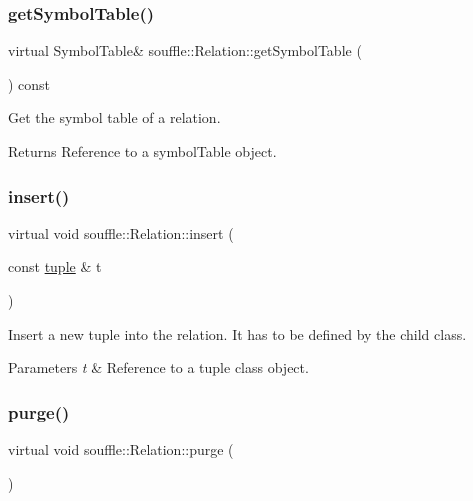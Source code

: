 \subsubsection{\texorpdfstring{get\+Symbol\+Table()}{getSymbolTable()}}
{\footnotesize\ttfamily virtual Symbol\+Table\& souffle\+::\+Relation\+::get\+Symbol\+Table (\begin{DoxyParamCaption}{ }\end{DoxyParamCaption}) const\hspace{0.3cm}{\ttfamily [pure virtual]}}

Get the symbol table of a relation. \begin{DoxyReturn}{Returns}
Reference to a symbol\+Table object. 
\end{DoxyReturn}
\mbox{\label{classsouffle_1_1_relation_a4f118226c04197b2efa9901c91873b09}} 
\subsubsection{\texorpdfstring{insert()}{insert()}}
{\footnotesize\ttfamily virtual void souffle\+::\+Relation\+::insert (\begin{DoxyParamCaption}\item[{const \hyperlink{classsouffle_1_1tuple}{tuple} \&}]{t }\end{DoxyParamCaption})\hspace{0.3cm}{\ttfamily [pure virtual]}}

Insert a new tuple into the relation. It has to be defined by the child class. 
\begin{DoxyParams}{Parameters}
{\em t} & Reference to a tuple class object. \\
\hline
\end{DoxyParams}
\mbox{\label{classsouffle_1_1_relation_a813a8dcd5e6b8c1415258e0059762fd3}} 
\subsubsection{\texorpdfstring{purge()}{purge()}}
{\footnotesize\ttfamily virtual void souffle\+::\+Relation\+::purge (\begin{DoxyParamCaption}{ }\end{DoxyParamCaption})\hspace{0.3cm}{\ttfamily [pure virtual]}}

